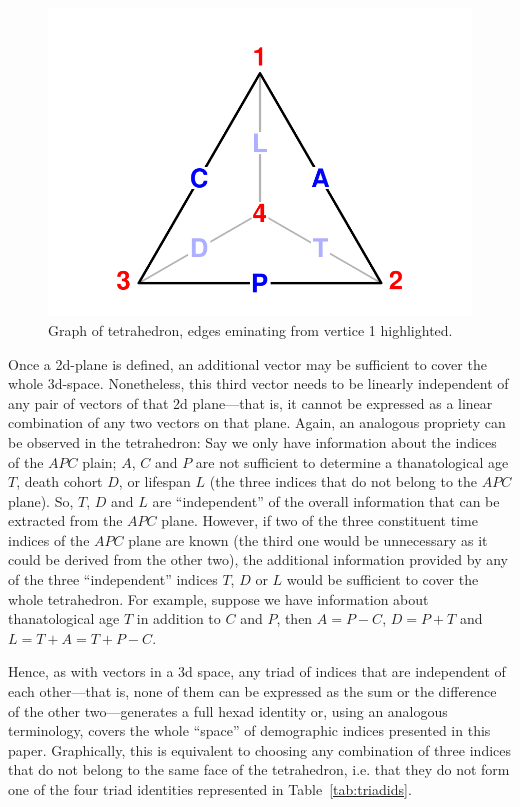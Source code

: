 \documentclass[11pt,oneside,a4paper]{article} %
\newcommand\vt[1]{\textcolor{rd}{#1}}
\begin{document}
\begin{figure}[h!]
\centering
\caption{Graph of tetrahedron, edges eminating from vertice \vt{1} highlighted.}
\label{fig:tet4vert1}
\includegraphics[scale=1]{Figures/tet4vert1New.pdf}
\end{figure}
\noindent 

Once a 2d-plane is defined, an additional vector may be sufficient to cover the whole 3d-space. Nonetheless, this third vector needs to be linearly independent of any pair of vectors of that 2d plane---that is, it cannot be expressed as a linear combination of any two vectors on that plane. Again, an analogous propriety can be observed in the tetrahedron: Say we only have information about the indices of the $APC$ plain; $A$, $C$ and $P$ are not sufficient to determine a thanatological age $T$, death cohort $D$, or lifespan $L$ (the three indices that do not belong to the $APC$ plane). So, $T$, $D$ and $L$ are ``independent'' of the overall information that can be extracted from the $APC$ plane. However, if two of the three constituent time indices of the $APC$ plane are known (the third one would be
unnecessary as it could be derived from the other two), the additional
information provided by any of the three ``independent'' indices $T$, $D$ or
$L$ would be sufficient to cover the whole tetrahedron. For example, suppose we
have information about thanatological age $T$ in addition to $C$ and $P$, then
$A=P-C$, $D=P+T$ and $L=T+A=T+P-C$. 

Hence, as with vectors in a 3d space, any
triad of indices that are independent of each other---that is, none of them can
be expressed as the sum or the difference of the other two---generates a full
hexad identity or, using an analogous terminology, covers the whole ``space'' of
demographic indices presented in this paper. Graphically, this is equivalent to
choosing any combination of three indices that do not belong to the same face
of the tetrahedron, i.e. that they do not form one of the four triad identities represented in Table~\ref{tab:triadids}.
\end{document}
